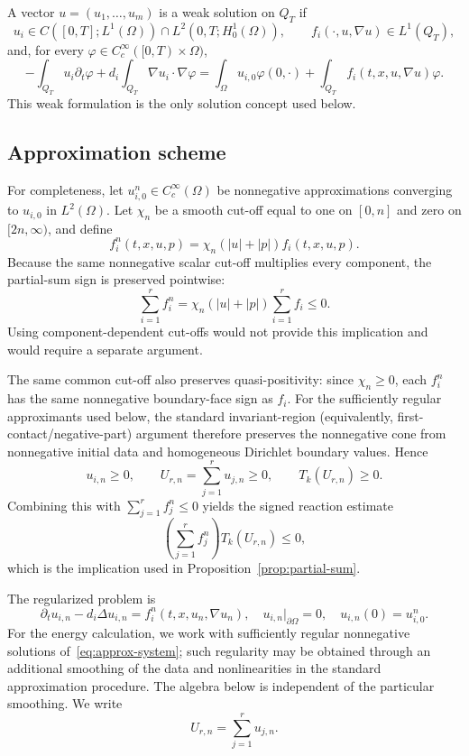 A vector $u=(u_1,\ldots,u_m)$ is a weak solution on $Q_T$ if
\[
 u_i\in C([0,T];L^1(\Omega))\cap L^2(0,T;H_0^1(\Omega)),\qquad
 f_i(\cdot,u,\nabla u)\in L^1(Q_T),
\]
and, for every $\varphi\in C_c^\infty([0,T)\times\Omega)$,
\[
 -\int_{Q_T}u_i\partial_t\varphi+d_i\int_{Q_T}\nabla u_i\cdot\nabla\varphi
 =\int_\Omega u_{i,0}\varphi(0,\cdot)+\int_{Q_T}f_i(t,x,u,\nabla u)\varphi.
\]
This weak formulation is the only solution concept used below.

\subsection{Approximation scheme}

For completeness, let $u_{i,0}^n\in C_c^\infty(\Omega)$ be nonnegative approximations converging to $u_{i,0}$ in $L^2(\Omega)$. Let $\chi_n$ be a smooth cut-off equal to one on $[0,n]$ and zero on $[2n,\infty)$, and define
\[
 f_i^n(t,x,u,p)=\chi_n(|u|+|p|)f_i(t,x,u,p).
\]
Because the same nonnegative scalar cut-off multiplies every component, the partial-sum sign is preserved pointwise:
\[
 \sum_{i=1}^r f_i^n=\chi_n(|u|+|p|)\sum_{i=1}^r f_i\le0.
\]
Using component-dependent cut-offs would not provide this implication and would require a separate argument.

The same common cut-off also preserves quasi-positivity: since $\chi_n\ge0$, each $f_i^n$ has the same nonnegative boundary-face sign as $f_i$. For the sufficiently regular approximants used below, the standard invariant-region (equivalently, first-contact/negative-part) argument therefore preserves the nonnegative cone from nonnegative initial data and homogeneous Dirichlet boundary values. Hence
\[
u_{i,n}\ge0,\qquad U_{r,n}=\sum_{j=1}^r u_{j,n}\ge0,\qquad T_k(U_{r,n})\ge0.
\]
Combining this with $\sum_{j=1}^r f_j^n\le0$ yields the signed reaction estimate
\[
\left(\sum_{j=1}^r f_j^n\right)T_k(U_{r,n})\le0,
\]
which is the implication used in Proposition~\ref{prop:partial-sum}.

The regularized problem is
\begin{equation}
 \partial_tu_{i,n}-d_i\Delta u_{i,n}=f_i^n(t,x,u_n,\nabla u_n),
 \quad u_{i,n}|_{\partial\Omega}=0,
 \quad u_{i,n}(0)=u_{i,0}^n.
 \label{eq:approx-system}
\end{equation}
For the energy calculation, we work with sufficiently regular nonnegative solutions of~\eqref{eq:approx-system}; such regularity may be obtained through an additional smoothing of the data and nonlinearities in the standard approximation procedure. The algebra below is independent of the particular smoothing. We write
\[
 U_{r,n}=\sum_{j=1}^r u_{j,n}.
\]

